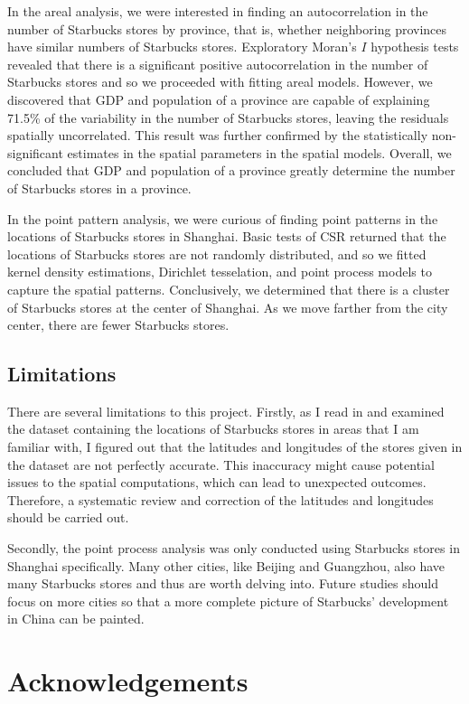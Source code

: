 \documentclass{article}
\begin{document}
In the areal analysis, we were interested in finding an autocorrelation in the number of Starbucks stores by province, that is, whether neighboring provinces have similar numbers of Starbucks stores. Exploratory Moran's \(I\) hypothesis tests revealed that there is a significant positive autocorrelation in the number of Starbucks stores and so we proceeded with fitting areal models. However, we discovered that GDP and population of a province are capable of explaining 71.5\% of the variability in the number of Starbucks stores, leaving the residuals spatially uncorrelated. This result was further confirmed by the statistically non-significant estimates in the spatial parameters in the spatial models. Overall, we concluded that GDP and population of a province greatly determine the number of Starbucks stores in a province.

In the point pattern analysis, we were curious of finding point patterns in the locations of Starbucks stores in Shanghai. Basic tests of CSR returned that the locations of Starbucks stores are not randomly distributed, and so we fitted kernel density estimations, Dirichlet tesselation, and point process models to capture the spatial patterns. Conclusively, we determined that there is a cluster of Starbucks stores at the center of Shanghai. As we move farther from the city center, there are fewer Starbucks stores.

\subsection{Limitations}

There are several limitations to this project. Firstly, as I read in and examined the dataset containing the locations of Starbucks stores in areas that I am familiar with, I figured out that the latitudes and longitudes of the stores given in the dataset are not perfectly accurate. This inaccuracy might cause potential issues to the spatial computations, which can lead to unexpected outcomes. Therefore, a systematic review and correction of the latitudes and longitudes should be carried out.

Secondly, the point process analysis was only conducted using Starbucks stores in Shanghai specifically. Many other cities, like Beijing and Guangzhou, also have many Starbucks stores and thus are worth delving into. Future studies should focus on more cities so that a more complete picture of Starbucks' development in China can be painted.

\section{Acknowledgements}
\end{document}
